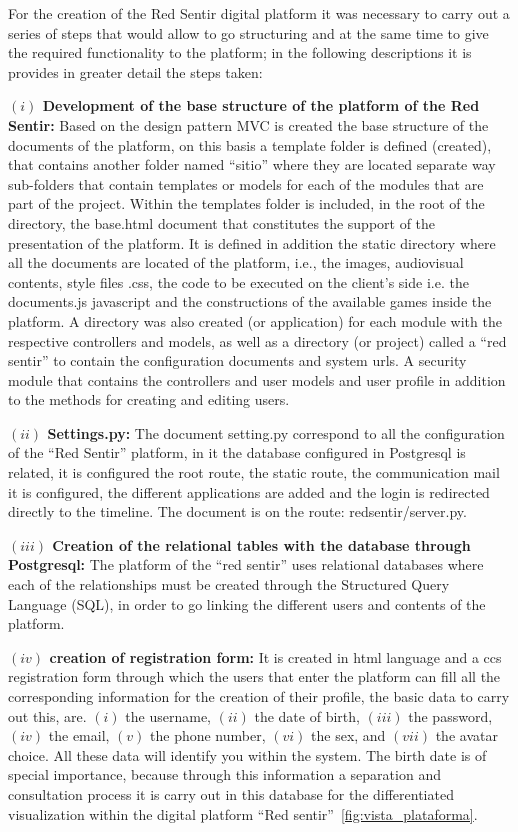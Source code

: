 \documentclass[journal,transmag]{IEEEtran}
\begin{document}
For the creation of the Red Sentir digital platform it was necessary to carry out a series of steps that would allow to go structuring and at the same time to give the required functionality to the platform; in the following descriptions it is provides in greater detail the steps taken:

\textbf{$(i)$ Development of the base structure of the platform of the Red Sentir:} Based on the design pattern MVC is created the base structure of the documents of the platform, on this basis a template folder is defined (created), that contains another folder named ``sitio'' where they are located separate way sub-folders that contain templates or models for each of the modules that are part of the project. Within the templates folder is included, in the root of the directory, the base.html document that constitutes the support of the presentation of the platform. It is defined in addition the static directory where all the documents are located of the platform, i.e., the images, audiovisual contents, style files .css, the code to be executed on the client's side i.e. the documents.js javascript and the constructions of the available games inside the platform. A directory was also created (or application) for each module with the respective controllers and models, as well as a directory (or project) called a ``red sentir'' to contain the configuration documents and system urls. A security module that contains the controllers and user models and user profile in addition to the methods for creating and editing users.

\textbf{$(ii)$ Settings.py:} The document setting.py correspond to all the configuration of the “Red Sentir” platform, in it the database configured in Postgresql is related, it is configured the root route, the static route, the communication mail it is configured, the different applications are added and the login is redirected directly to the timeline. The document is on the route: redsentir/server.py.

\textbf{$(iii)$ Creation of the relational tables with the database through Postgresql:} The platform of the “red sentir” uses relational databases where each of the relationships must be created through the Structured Query Language (SQL), in order to go linking the different users and contents of the platform.

\textbf{$(iv)$ creation of registration form:} It is created in html language and a ccs registration form through which the users that enter the platform can fill all the corresponding information for the creation of their profile, the basic data to carry out this, are. $(i)$ the username, $(ii)$ the date of birth, $(iii)$ the password, $(iv)$ the email, $(v)$ the phone number, $(vi)$ the sex, and $(vii)$ the avatar choice. All these data will identify you within the system. The birth date is of special importance, because through this information a separation and consultation process it is carry out in this database for the differentiated visualization within the digital platform “Red sentir”~\ref{fig:vista_plataforma}.
\end{document}

